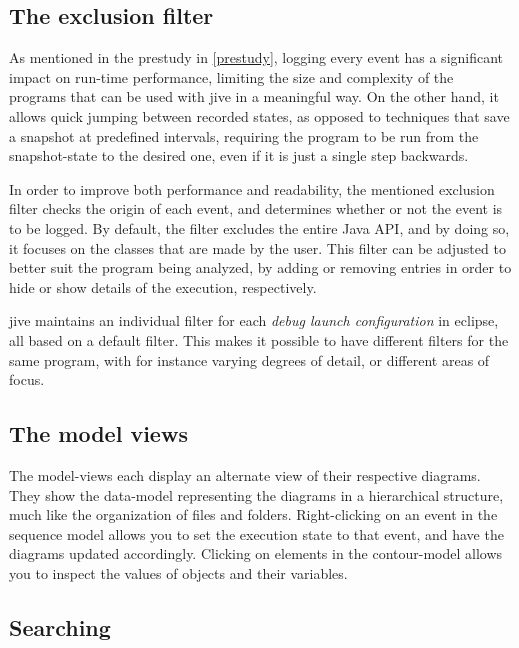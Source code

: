 \subsection{The exclusion filter}\label{jiveFeatFilter}

As mentioned in the prestudy in \cref{prestudy}, logging every event has a significant impact on run-time performance, limiting the size and complexity of the programs that can be used with \gls{jive} in a meaningful way.
On the other hand, it allows quick jumping between recorded states, as opposed to techniques that save a snapshot at predefined intervals, requiring the program to be run from the snapshot-state to the desired one, even if it is just a single step backwards.

In order to improve both performance and readability, the mentioned exclusion filter checks the origin of each event, and determines whether or not the event is to be logged.
By default, the filter excludes the entire Java API, and by doing so, it focuses on the classes that are made by the user.
This filter can be adjusted to better suit the program being analyzed, by adding or removing entries in order to hide or show details of the execution, respectively.

\gls{jive} maintains an individual filter for each \emph{debug launch configuration} in eclipse, all based on a default filter.
This makes it possible to have different filters for the same program, with for instance varying degrees of detail, or different areas of focus.

\subsection{The model views}\label{jiveFeatModelView}

The model-views each display an alternate view of their respective diagrams.
They show the data-model representing the diagrams in a hierarchical structure, much like the organization of files and folders.
Right-clicking on an event in the sequence model allows you to set the execution state to that event, and have the diagrams updated accordingly.
Clicking on elements in the contour-model allows you to inspect the values of objects and their variables.

\subsection{Searching}\label{jiveFeatSearch}

